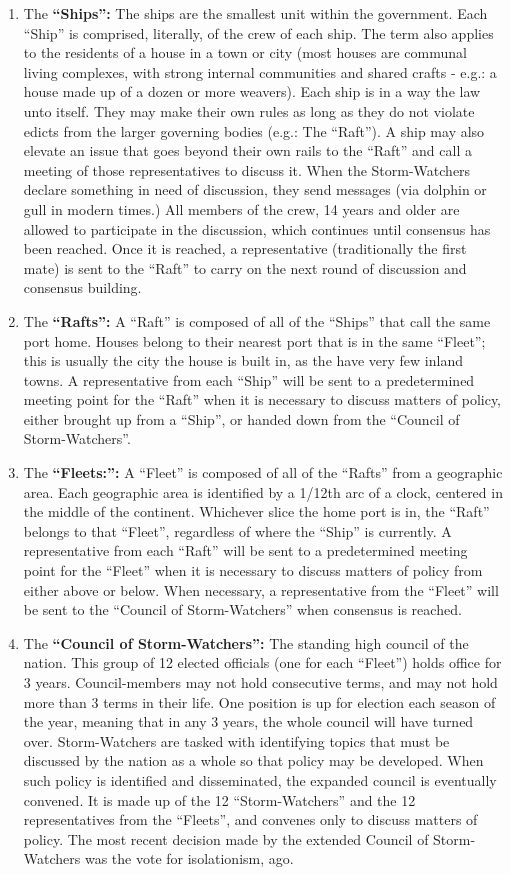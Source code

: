 \documentclass[blue]{GL2020}
\begin{document}
\begin{enumerate}	
	\item The {\bf``Ships'':} The ships are the smallest unit within the \pShip{} government. Each ``Ship'' is comprised, literally, of the crew of each ship. The term also applies to the residents of a house in a town or city (most \pShip{} houses are communal living complexes, with strong internal communities and shared crafts - e.g.: a house made up of a dozen or more weavers). Each ship is in a way the law unto itself. They may make their own rules as long as they do not violate edicts from the larger governing bodies (e.g.: The ``Raft''). A ship may also elevate an issue that goes beyond their own rails to the ``Raft'' and call a meeting of those representatives to discuss it. When the Storm-Watchers declare something in need of discussion, they send messages (via dolphin or gull in modern times.) All members of the crew, 14 years and older are allowed to participate in the discussion, which continues until consensus has been reached. Once it is reached, a representative (traditionally the first mate) is sent to the ``Raft'' to carry on the next round of discussion and consensus building.
		\item The {\bf ``Rafts'':} A ``Raft'' is composed of all of the ``Ships'' that call the same port home. Houses belong to their nearest port that is in the same ``Fleet''; this is usually the city the house is built in, as the \pShippies{} have very few inland towns. A representative from each ``Ship'' will be sent to a predetermined meeting point for the ``Raft'' when it is necessary to discuss matters of policy, either brought up from a ``Ship'', or handed down from the ``Council of Storm-Watchers''.
		\item The {\bf``Fleets:'':} A ``Fleet'' is composed of all of the ``Rafts'' from a geographic area. Each geographic area is identified by a 1/12th arc of a clock, centered in the middle of the continent. Whichever slice the home port is in, the ``Raft'' belongs to that ``Fleet'', regardless of where the ``Ship'' is currently. A representative from each ``Raft'' will be sent to a predetermined meeting point for the ``Fleet'' when it is necessary to discuss matters of policy from either above or below. When necessary, a representative from the ``Fleet'' will be sent to the ``Council of Storm-Watchers'' when consensus is reached.
		\item The {\bf``Council of Storm-Watchers'':} The standing high council of the \pShip{} nation. This group of 12 elected officials (one for each ``Fleet'') holds office for 3 years. Council-members may not hold consecutive terms, and may not hold more than 3 terms in their life. One position is up for election each season of the year, meaning that in any 3 years, the whole council will have turned over. Storm-Watchers are tasked with identifying topics that must be discussed by the nation as a whole so that policy may be developed. When such policy is identified and disseminated, the expanded council is eventually convened. It is made up of the 12 ``Storm-Watchers'' and the 12 representatives from the ``Fleets'', and convenes only to discuss matters of policy. The most recent decision made by the extended Council of Storm-Watchers was the vote for isolationism, \pIsolation{} ago.

\end{enumerate}
\end{document}
